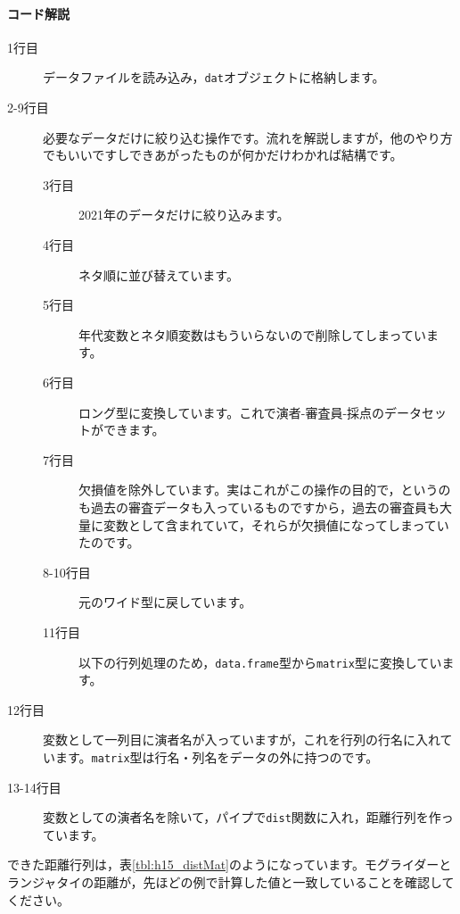 \documentclass{ltjsbook}
\begin{document}
\paragraph{コード解説}
\begin{description}
    \item[1行目] データファイルを読み込み，\verb|dat|オブジェクトに格納します。
    \item[2-9行目] 必要なデータだけに絞り込む操作です。流れを解説しますが，他のやり方でもいいですしできあがったものが何かだけわかれば結構です。
        \begin{description}
            \item[3行目] 2021年のデータだけに絞り込みます。
            \item[4行目] ネタ順に並び替えています。
            \item[5行目] 年代変数とネタ順変数はもういらないので削除してしまっています。
            \item[6行目] ロング型に変換しています。これで演者-審査員-採点のデータセットができます。
            \item[7行目] 欠損値を除外しています。実はこれがこの操作の目的で，というのも過去の審査データも入っているものですから，過去の審査員も大量に変数として含まれていて，それらが欠損値になってしまっていたのです。
            \item[8-10行目] 元のワイド型に戻しています。
            \item[11行目] 以下の行列処理のため，\verb|data.frame|型から\verb|matrix|型に変換しています。
        \end{description}
    \item[12行目] 変数として一列目に演者名が入っていますが，これを行列の行名に入れています。\verb|matrix|型は行名・列名をデータの外に持つのです。
    \item[13-14行目] 変数としての演者名を除いて，パイプで\verb|dist|関数に入れ，距離行列を作っています。
\end{description}
できた距離行列は，表\ref{tbl:h15_distMat}のようになっています。モグライダーとランジャタイの距離が，先ほどの例で計算した値と一致していることを確認してください。
\end{document}
